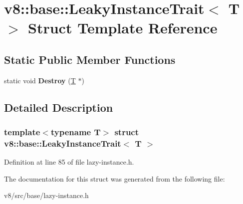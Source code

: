 \hypertarget{structv8_1_1base_1_1LeakyInstanceTrait}{}\section{v8\+:\+:base\+:\+:Leaky\+Instance\+Trait$<$ T $>$ Struct Template Reference}
\label{structv8_1_1base_1_1LeakyInstanceTrait}
\subsection*{Static Public Member Functions}
\begin{DoxyCompactItemize}
\item 
\mbox{\label{structv8_1_1base_1_1LeakyInstanceTrait_acf87b18eb53d3c141242ce3d914af876}} 
static void {\bfseries Destroy} (\mbox{\hyperlink{classv8_1_1internal_1_1torque_1_1T}{T}} $\ast$)
\end{DoxyCompactItemize}


\subsection{Detailed Description}
\subsubsection*{template$<$typename T$>$\newline
struct v8\+::base\+::\+Leaky\+Instance\+Trait$<$ T $>$}



Definition at line 85 of file lazy-\/instance.\+h.



The documentation for this struct was generated from the following file\+:\begin{DoxyCompactItemize}
\item 
v8/src/base/lazy-\/instance.\+h\end{DoxyCompactItemize}
